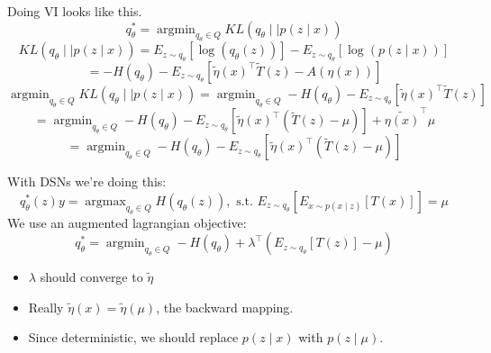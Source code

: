 \documentclass[11pt]{article}
\DeclareMathOperator*{\argmin}{argmin}
\DeclareMathOperator*{\argmax}{argmax}
\begin{document}
Doing VI looks like this.
\begin{equation}
q_\theta^* = \argmin_{q_\theta \in Q} KL(q_\theta \mid \mid p(z \mid x))
\end{equation}
\begin{equation}
KL(q_\theta \mid \mid p(z \mid x)) = E_{z \sim q_\theta} \left[ \log (q_\theta(z)) \right] - E_{z \sim q_\theta} \left[ \log (p(z \mid x)) \right]
\end{equation}
\begin{equation}
 = -H(q_\theta) - E_{z \sim q_\theta} \left[ \tilde{\eta}(x)^\top  \tilde{T}(z) - A(\eta(x)) \right]
\end{equation}
\begin{equation}
 \argmin_{q_\theta \in Q} KL(q_\theta \mid \mid p(z \mid x)) =  \argmin_{q_\theta \in Q} -H(q_\theta) - E_{z \sim q_\theta} \left[ \tilde{\eta}(x)^\top  \tilde{T}(z) \right]
 \end{equation}
 \begin{equation}
=  \argmin_{q_\theta \in Q} -H(q_\theta) - E_{z \sim q_\theta} \left[ \tilde{\eta}(x)^\top \left(  \tilde{T}(z) -\mu \right) \right] + \tilde{\eta(x)}^\top \mu
 \end{equation}
  \begin{equation}
=  \argmin_{q_\theta \in Q} -H(q_\theta) - E_{z \sim q_\theta} \left[ \tilde{\eta}(x)^\top \left(  \tilde{T}(z) -\mu \right) \right]
 \end{equation}

With DSNs we're doing this:
\begin{equation}
q_\theta^*(z) y= \argmax_{q_\theta \in Q} H(q_\theta(z)),   \text{  s.t.  } E_{z \sim q_\theta}\left[ E_{x\sim p(x \mid z)}\left[T(x)\right] \right] = \mu
\end{equation}
We use an augmented lagrangian objective:
\begin{equation}
q_\theta^* = \argmin_{q_\theta \in Q} - H(q_\theta) + \lambda^\top \left(E_{z \sim q_\theta} \left[T(z) \right] - \mu \right)
\end{equation}
\begin{itemize}
\item $\lambda$ should converge to $\tilde{\eta}$
\item Really $\tilde{\eta}(x) = \tilde{\eta}(\mu)$, the backward mapping.
\item Since deterministic, we should replace $p(z \mid x)$ with $p(z \mid \mu)$.
\end{itemize}
\end{document}
